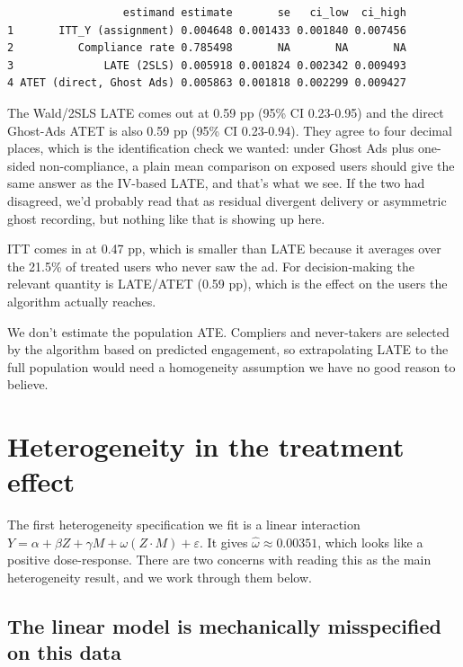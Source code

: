 \documentclass[
  letterpaper,
  DIV=11,
  numbers=noendperiod]{scrartcl}
\begin{document}
\begin{verbatim}
                  estimand estimate       se   ci_low  ci_high
1       ITT_Y (assignment) 0.004648 0.001433 0.001840 0.007456
2          Compliance rate 0.785498       NA       NA       NA
3              LATE (2SLS) 0.005918 0.001824 0.002342 0.009493
4 ATET (direct, Ghost Ads) 0.005863 0.001818 0.002299 0.009427
\end{verbatim}

The Wald/2SLS LATE comes out at 0.59 pp (95\% CI 0.23-0.95) and the
direct Ghost-Ads ATET is also 0.59 pp (95\% CI 0.23-0.94). They agree to
four decimal places, which is the identification check we wanted: under
Ghost Ads plus one-sided non-compliance, a plain mean comparison on
exposed users should give the same answer as the IV-based LATE, and
that's what we see. If the two had disagreed, we'd probably read that as
residual divergent delivery or asymmetric ghost recording, but nothing
like that is showing up here.

ITT comes in at 0.47 pp, which is smaller than LATE because it averages
over the 21.5\% of treated users who never saw the ad. For
decision-making the relevant quantity is LATE/ATET (0.59 pp), which is
the effect on the users the algorithm actually reaches.

We don't estimate the population ATE. Compliers and never-takers are
selected by the algorithm based on predicted engagement, so
extrapolating LATE to the full population would need a homogeneity
assumption we have no good reason to believe.

\section{Heterogeneity in the treatment
effect}\label{heterogeneity-in-the-treatment-effect}

The first heterogeneity specification we fit is a linear interaction
\(Y = \alpha + \beta Z + \gamma M + \omega (Z \cdot M) + \varepsilon\).
It gives \(\hat\omega \approx 0.00351\), which looks like a positive
dose-response. There are two concerns with reading this as the main
heterogeneity result, and we work through them below.

\subsection{The linear model is mechanically misspecified on this
data}\label{the-linear-model-is-mechanically-misspecified-on-this-data}
\end{document}
